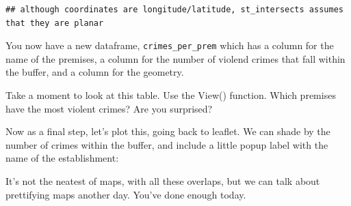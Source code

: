 \documentclass[]{book}
\newenvironment{Shaded}{\begin{snugshade}}{\end{snugshade}}
\newcommand{\DataTypeTok}[1]{\textcolor[rgb]{0.13,0.29,0.53}{#1}}
\newcommand{\DecValTok}[1]{\textcolor[rgb]{0.00,0.00,0.81}{#1}}
\newcommand{\FloatTok}[1]{\textcolor[rgb]{0.00,0.00,0.81}{#1}}
\newcommand{\KeywordTok}[1]{\textcolor[rgb]{0.13,0.29,0.53}{\textbf{#1}}}
\newcommand{\NormalTok}[1]{#1}
\newcommand{\OperatorTok}[1]{\textcolor[rgb]{0.81,0.36,0.00}{\textbf{#1}}}
\newcommand{\OtherTok}[1]{\textcolor[rgb]{0.56,0.35,0.01}{#1}}
\newcommand{\StringTok}[1]{\textcolor[rgb]{0.31,0.60,0.02}{#1}}
\begin{document}
\begin{verbatim}
## although coordinates are longitude/latitude, st_intersects assumes that they are planar
\end{verbatim}

You now have a new dataframe, \texttt{crimes\_per\_prem} which has a column for the name of the premises, a column for the number of violend crimes that fall within the buffer, and a column for the geometry.

Take a moment to look at this table. Use the View() function. Which premises have the most violent crimes? Are you surprised?

Now as a final step, let's plot this, going back to leaflet. We can shade by the number of crimes within the buffer, and include a little popup label with the name of the establishment:

\begin{Shaded}
\end{Shaded}

\hypertarget{htmlwidget-8728eeda65ef46a9ccb1}{}

It's not the neatest of maps, with all these overlaps, but we can talk about prettifying maps another day. You've done enough today.
\end{document}
